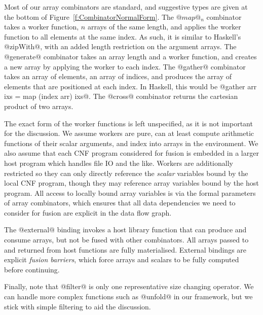 Most of our array combinators are standard, and suggestive types are given at the bottom of Figure~\ref{f:CombinatorNormalForm}. The $@map@_n$ combinator takes a worker function, $n$ arrays of the same length, and applies the worker function to all elements at the same index. As such, it is similar to Haskell's @zipWith@, with an added length restriction on the argument arrays. The @generate@ combinator takes an array length and a worker function, and creates a new array by applying the worker to each index. The @gather@ combinator takes an array of elements, an array of indices, and produces the array of elements that are positioned at each index. In Haskell, this would be @gather arr ixs = map (index arr) ixs@. The @cross@ combinator returns the cartesian product of two arrays. 

The exact form of the worker functions is left unspecified, as it is not important for the discussion. We assume workers are pure, can at least compute arithmetic functions of their scalar arguments, and index into arrays in the environment. We also assume that each CNF program considered for fusion is embedded in a larger host program which handles file IO and the like. Workers are additionally restricted so they can only directly reference the \emph{scalar} variables bound by the local CNF program, though they may reference array variables bound by the host program. All access to locally bound array variables is via the formal parameters of array combinators, which ensures that all data dependencies we need to consider for fusion are explicit in the data flow graph.

The @external@ binding invokes a host library function that can produce and consume arrays, but not be fused with other combinators. All arrays passed to and returned from host functions are fully materialised. External bindings are explicit \emph{fusion barriers}, which force arrays and scalars to be fully computed before continuing. 

Finally, note that @filter@ is only one representative size changing operator. We can handle more complex functions such as @unfold@ in our framework, but we stick with simple filtering to aid the discussion.




